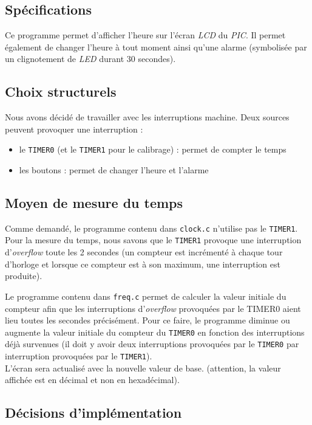 \subsection{Spécifications}

Ce programme permet d'afficher l'heure sur l'écran \textit{LCD} du \textit{PIC}. Il permet également de changer l'heure à tout moment ainsi qu'une alarme (symbolisée par un clignotement de \textit{LED} durant 30 secondes).

\subsection{Choix structurels}\label{choix}

Nous avons décidé de travailler avec les interruptions machine. Deux sources peuvent provoquer une interruption :
\begin{itemize}
	\item le \texttt{TIMER0} (et le \texttt{TIMER1} pour le calibrage) : permet de compter le temps
	\item les boutons : permet de changer l'heure et l'alarme 
\end{itemize}

\subsection{Moyen de mesure du temps}

Comme demandé, le programme contenu dans \texttt{clock.c} n'utilise pas le \texttt{TIMER1}. Pour la mesure du temps, nous savons que le \texttt{TIMER1} provoque une interruption d'\textit{overflow} toute les 2 secondes (un compteur est incrémenté à chaque tour d'horloge et lorsque ce compteur est à son maximum, une interruption est produite).

Le programme contenu dans \texttt{freq.c} permet de calculer la valeur initiale du compteur afin que les interruptions d'\textit{overflow} provoquées par le TIMER0 aient lieu toutes les secondes précisément. Pour ce faire, le programme diminue ou augmente la valeur initiale du compteur du \texttt{TIMER0} en fonction des interruptions déjà survenues (il doit y avoir deux interruptions provoquées par le \texttt{TIMER0} par interruption provoquées par le \texttt{TIMER1}).\\
L'écran sera actualisé avec la nouvelle valeur de base. (attention, la valeur affichée est en décimal et non en hexadécimal).

\subsection{Décisions d'implémentation}


